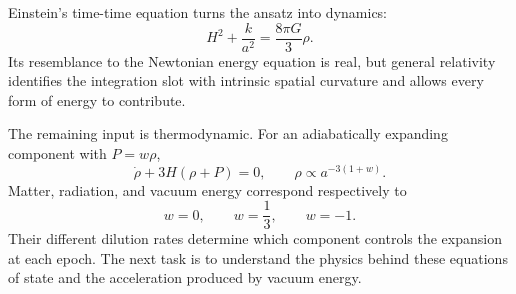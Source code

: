 Einstein's time-time equation turns the ansatz into dynamics:
\begin{equation}
H^2+\frac{k}{a^2}=\frac{8\pi G}{3}\rho.
\end{equation}
Its resemblance to the Newtonian energy equation is real, but general relativity identifies the integration slot with intrinsic spatial curvature and allows every form of energy to contribute.

The remaining input is thermodynamic. For an adiabatically expanding component with \(P=w\rho\),
\begin{equation}
\dot\rho+3H(\rho+P)=0,
\qquad
\rho\propto a^{-3(1+w)}.
\end{equation}
Matter, radiation, and vacuum energy correspond respectively to
\begin{equation}
w=0,\qquad w=\frac13,\qquad w=-1.
\end{equation}
Their different dilution rates determine which component controls the expansion at each epoch. The next task is to understand the physics behind these equations of state and the acceleration produced by vacuum energy.
